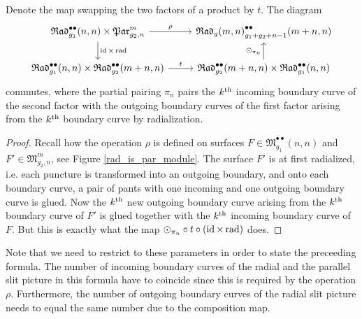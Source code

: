 \begin{prop}
\label{rad_rho_comp}
   Denote the map swapping the two factors of a product by $t$.
   The diagram
   \[
    \begin{tikzcd}
	\Radt^{\bullet \bullet}_{g_1}(n, n) \times \Part_{g_2, n}^m \arrow{d}{\id \times \radmap} \arrow{r}{\rho} & \Rad^{\bullet \bullet}_{g_1 + g_2 + n - 1}(m + n, n)\\
	\Radt^{\bullet \bullet}_{g_1}(n, n) \times \Radt^{\bullet \bullet}_{g_2}(m+n, n) \arrow{r}{t} & \Radt^{\bullet \bullet}_{g_2}(m+n, n) \times \Radt^{\bullet \bullet}_{g_1}(n, n) \arrow{u}{\odot_{\pi_n}}
    \end{tikzcd}
    \]
    commutes,
    where the partial pairing $\pi_n$ pairs the $k^{\text{th}}$ incoming boundary curve of the second factor with the outgoing boundary curves of the first factor arising from the $k^{\text{th}}$ boundary curve by radialization.
    \begin{proof}
       Recall how the operation $\rho$ is defined on surfaces $F \in \mathfrak M^{\bullet \bullet}_{g_1}(n, n)$ and $F' \in \mathfrak M_{g_2, n}^m$, see Figure \ref{rad_is_par_module}.
       The surface $F'$ is at first radialized, i.e. each puncture is transformed into an outgoing boundary, 
       and onto each boundary curve, a pair of pants with one incoming and one outgoing boundary curve is glued.
       Now the $k^{\text{th}}$ new outgoing boundary curve arising from the $k^{\text{th}}$ boundary curve of $F'$ is glued together with the $k^{\text{th}}$ incoming boundary curve of $F$.
       But this is exactly what the map $\odot_{\pi_n} \circ t \circ (\operatorname{id} \times \operatorname{rad})$ does.
    \end{proof}
\end{prop}

Note that we need to restrict to these parameters in order to state the preceeding formula.
The number of incoming boundary curves of the radial and the parallel slit picture in this formula have to coincide since this is required by the operation $\rho$.
Furthermore, the number of outgoing boundary curves of the radial slit picture needs to equal the same number due to the composition map.

